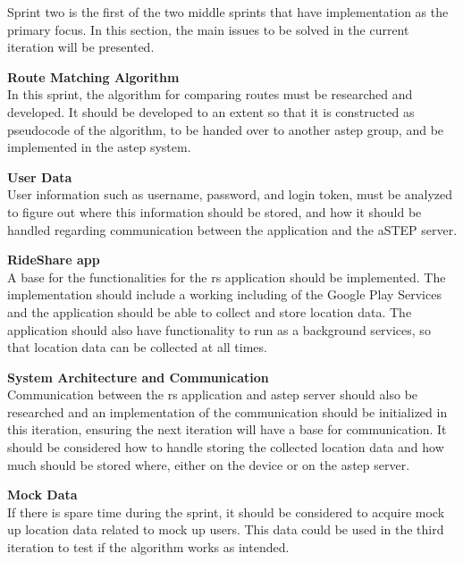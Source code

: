 Sprint two is the first of the two middle sprints that have implementation as the primary focus. In this section, the main issues to be solved in the current iteration will be presented.

\textbf{Route Matching Algorithm}\\
In this sprint, the algorithm for comparing routes must be researched and developed. 
It should be developed to an extent so that it is constructed as pseudocode of the algorithm, to be handed over to another \gls{astep} group, and be implemented in the \gls{astep} system.

\textbf{User Data}\\
User information such as username, password, and login token, must be analyzed to figure out where this information should be stored, and how it should be handled regarding communication between the application and the aSTEP server. 

\textbf{RideShare app}\\
A base for the functionalities for the \gls{rs} application should be implemented. 
The implementation should include a working  including of the Google Play Services and the application should be able to collect and store location data. 
The application should also have functionality to run as a background services, so that location data can be collected at all times.

\textbf{System Architecture and Communication}\\
Communication between the \gls{rs} application and \gls{astep} server should also be researched and an implementation of the communication should be initialized in this iteration, ensuring the next iteration will have a base for communication. 
It should be considered how to handle storing the collected location data and how much should be stored where, either on the device or on the \gls{astep} server.

\textbf{Mock Data}\\
If there is spare time during the sprint, it should be considered to acquire mock up location data related to mock up users. 
This data could be used in the third iteration to test if the algorithm works as intended.